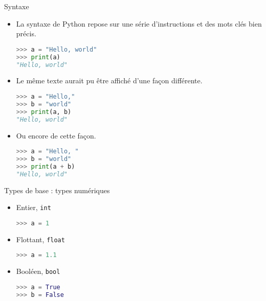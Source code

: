 \begin{frame}[fragile]{Syntaxe}

  \begin{itemize}
    \item<+->[\textcolor{white}{a}]La syntaxe de Python repose sur une série d'instructions et des mots clés bien précis.
\begin{lstlisting}[language=Python, morekeywords={as, TypeError}, numbers=none]
>>> a = "Hello, world"
>>> print(a)
"Hello, world"
\end{lstlisting}
    \item<+->[\textcolor{white}{a}]Le même texte aurait pu être affiché d'une façon différente.
\begin{lstlisting}[language=Python, morekeywords={as, TypeError}, numbers=none]
>>> a = "Hello,"
>>> b = "world"
>>> print(a, b)
"Hello, world"
\end{lstlisting}
    \item<+->[\textcolor{white}{a}]Ou encore de cette façon.
\begin{lstlisting}[language=Python, morekeywords={as, TypeError}, numbers=none]
>>> a = "Hello, "
>>> b = "world"
>>> print(a + b)
"Hello, world"
\end{lstlisting}
  \end{itemize}

\end{frame}

\begin{frame}[fragile]{Types de base : types numériques}
  
  \begin{block}{}
    \begin{itemize}
      \item Entier, \texttt{int}
\begin{lstlisting}[language=Python, morekeywords={as, TypeError}, numbers=none]
>>> a = 1
\end{lstlisting}
      \item Flottant, \texttt{float}
\begin{lstlisting}[language=Python, morekeywords={as, TypeError}, numbers=none]
>>> a = 1.1
\end{lstlisting}
      \item Booléen, \texttt{bool}
\begin{lstlisting}[language=Python, morekeywords={as, TypeError}, numbers=none]
>>> a = True
>>> b = False
\end{lstlisting}
    \end{itemize}
  \end{block}
\end{frame}


